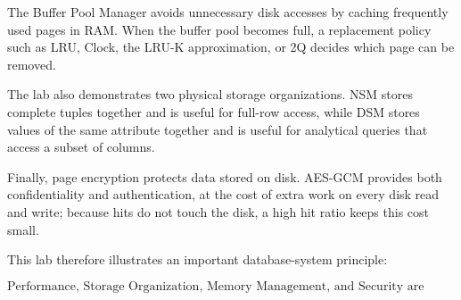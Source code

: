 \documentclass[12pt,a4paper]{article}
\begin{document}
The Buffer Pool Manager avoids unnecessary disk accesses by caching frequently used pages in RAM. When the buffer pool becomes full, a replacement policy such as LRU, Clock, the LRU-K approximation, or 2Q decides which page can be removed.

The lab also demonstrates two physical storage organizations. NSM stores complete tuples together and is useful for full-row access, while DSM stores values of the same attribute together and is useful for analytical queries that access a subset of columns.

Finally, page encryption protects data stored on disk. AES-GCM provides both confidentiality and authentication, at the cost of extra work on every disk read and write; because hits do not touch the disk, a high hit ratio keeps this cost small.

This lab therefore illustrates an important database-system principle:

\[
\boxed{
\text{Performance, Storage Organization, Memory Management, and Security are interconnected.}
}
\]
\end{document}
